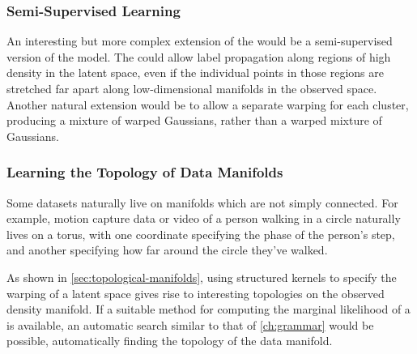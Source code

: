 

\subsubsection{Semi-Supervised Learning}

An interesting but more complex extension of the \iwmm{} would be a semi-supervised version of the model.
The \iwmm{} could allow label propagation along regions of high density in the latent space, even if the individual points in those regions are stretched far apart along low-dimensional manifolds in the observed space.
Another natural extension would be to allow a separate warping for each cluster, producing a mixture of warped Gaussians, rather than a warped mixture of Gaussians.%




\subsubsection{Learning the Topology of Data Manifolds}

Some datasets naturally live on manifolds which are not simply connected.
For example, motion capture data or video of a person walking in a circle naturally lives on a torus, with one coordinate specifying the phase of the person's step, and another specifying how far around the circle they've walked.

As shown in \cref{sec:topological-manifolds}, using structured kernels to specify the warping of a latent space gives rise to interesting topologies on the observed density manifold.
If a suitable method for computing the marginal likelihood of a \gplvm{} is available, an automatic search similar to that of \cref{ch:grammar} would be possible, automatically finding the topology of the data manifold.





